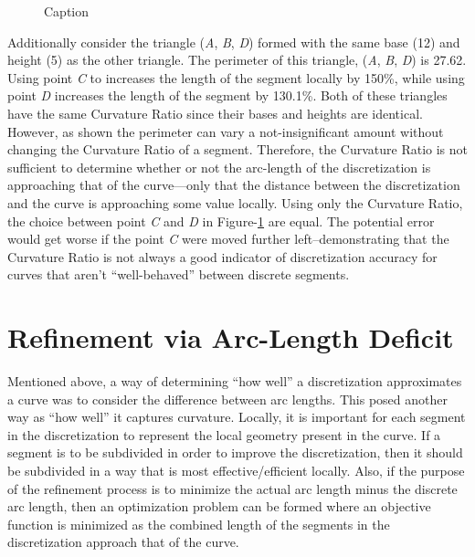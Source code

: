 \documentclass[preprint,12pt]{elsarticle}
\begin{document}
\begin{figure}[h!]
  \caption{\label{CurvatureRatioTriangles} Caption}
\end{figure}

\noindent Additionally consider the triangle (\textit{A}, \textit{B}, \textit{D}) formed with the same base (12) and height (5) as the other triangle.  The perimeter of this triangle, (\textit{A}, \textit{B}, \textit{D}) is 27.62. Using point \textit{C} to increases the length of the segment locally by 150\%, while using point \textit{D} increases the length of the segment by 130.1\%.  Both of these triangles have the same Curvature Ratio since their bases and heights are identical.  However, as shown the perimeter can vary a not-insignificant amount without changing the Curvature Ratio of a segment.  Therefore, the Curvature Ratio is not sufficient to determine whether or not the arc-length of the discretization is approaching that of the curve—only that the distance between the discretization and the curve is approaching some value locally.  Using only the Curvature Ratio, the choice between point \textit{C} and \textit{D} in Figure-\ref{CurvatureRatioTriangles} are equal.  The potential error would get worse if the point \textit{C} were moved further left--demonstrating that the Curvature Ratio is not always a good indicator of discretization accuracy for curves that aren’t ``well-behaved'' between discrete segments.

\section{Refinement via Arc-Length Deficit}
Mentioned above, a way of determining ``how well'' a discretization approximates a curve was to consider the difference between arc lengths.  This posed another way as ``how well'' it captures curvature.  Locally, it is important for each segment in the discretization to represent the local geometry present in the curve.  If a segment is to be subdivided in order to improve the discretization, then it should be subdivided in a way that is most effective/efficient locally.  Also, if the purpose of the refinement process is to minimize the actual arc length minus the discrete arc length, then an optimization problem can be formed where an objective function is minimized as the combined length of the segments in the discretization approach that of the curve.
\end{document}
